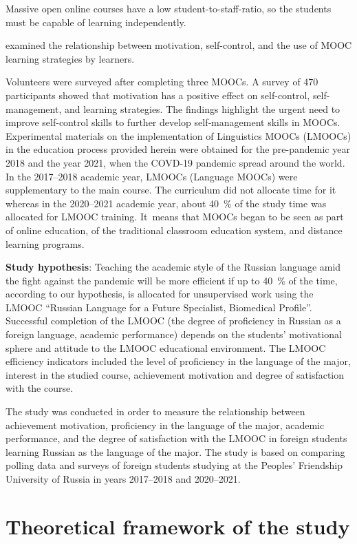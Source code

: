 \documentclass[english]{textolivre}
\begin{document}
Massive open online courses have a low student-to-staff-ratio, so the students must be capable of learning independently.

\textcite{rodes_teacher_2021} examined the relationship between motivation, self-control, and the use of MOOC learning strategies by learners.

Volunteers were surveyed after completing three MOOCs. A survey of 470 participants showed that motivation has a positive effect on self-control, self-management, and learning strategies.
The findings highlight the urgent need to improve self-control skills to further develop self‑management skills in MOOCs.
Experimental materials on the implementation of Linguistics MOOCs (LMOOCs) in the education process provided herein were obtained for the pre-pandemic year 2018 and the year 2021, when the COVD-19 pandemic spread around the world. In the 2017–2018 academic year, LMOOCs (Language MOOCs) were supplementary to the main course. The curriculum did not allocate time for it whereas in the 2020–2021 academic year, about 40 \% of the study time was allocated for LMOOC training. It means that MOOCs began to be seen as part of online education, of the traditional classroom education system, and distance learning programs.

\textbf{Study hypothesis}: Teaching the academic style of the Russian language amid the fight against the pandemic will be more efficient if up to 40 \% of the time, according to our hypothesis, is allocated for unsupervised work using the LMOOC “Russian Language for a Future Specialist, Biomedical Profile”. Successful completion of the LMOOC (the degree of proficiency in Russian as a foreign language, academic performance) depends on the students’ motivational sphere and attitude to the LMOOC educational environment. The LMOOC efficiency indicators included the level of proficiency in the language of the major, interest in the studied course, achievement motivation and degree of satisfaction with the course.

The study was conducted in order to measure the relationship between achievement motivation, proficiency in the language of the major, academic performance, and the degree of satisfaction with the LMOOC in foreign students learning Russian as the language of the major. The study is based on comparing polling data and surveys of foreign students studying at the Peoples’ Friendship University of Russia in years 2017–2018 and 2020–2021.

\section{Theoretical framework of the study}\label{sec-normas}
\end{document}
